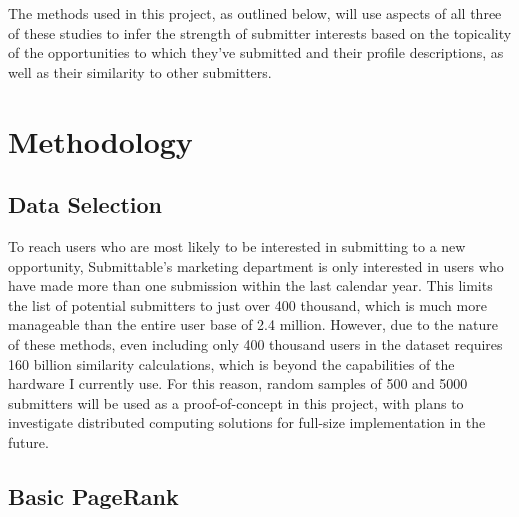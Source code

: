 \documentclass[12pt]{report}   %
\begin{document}
The methods used in this project, as outlined below, will use aspects of all three of these studies to infer the strength of submitter interests based on the topicality of the opportunities to which they've submitted and their profile descriptions, as well as their similarity to other submitters.


\chapter{Methodology}

\section{Data Selection}

To reach users who are most likely to be interested in submitting to a new opportunity, Submittable's marketing department is only interested in users who have made more than one submission within the last calendar year. This limits the list of potential submitters to just over 400 thousand, which is much more manageable than the entire user base of 2.4 million. However, due to the nature of these methods, even including only 400 thousand users in the dataset requires 160 billion similarity calculations, which is beyond the capabilities of the hardware I currently use. For this reason, random samples of 500 and 5000 submitters will be used as a proof-of-concept in this project, with plans to investigate distributed computing solutions for full-size implementation in the future.

\section{Basic PageRank}
\end{document}

